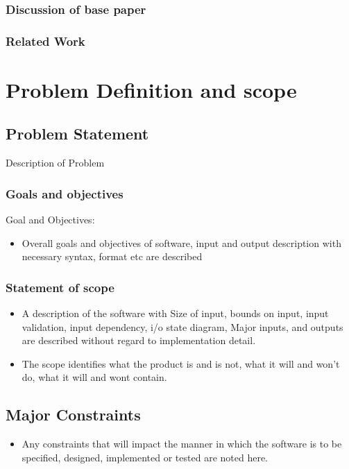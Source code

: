 \documentclass[12pt,a4paper]{article}
\begin{document}
\subsubsection{Discussion of base paper}
\subsubsection{Related Work}

\section{Problem Definition and scope}
\setcounter{section}{4}

\subsection{Problem Statement}

Description of Problem


\subsubsection{Goals and objectives}  

Goal and Objectives: 
\begin{itemize}
  	\item Overall goals and objectives of software, input and output description with necessary syntax, format etc are described
\end{itemize}

 \subsubsection{Statement of scope} 
	\begin{itemize}  
	\item	A description of the software with Size of input, bounds on input, input validation, input dependency, i/o state diagram, Major inputs, and outputs are described without regard to implementation detail.
	\item The scope identifies what the product is and is not, what it will and won’t do, what it will and wont contain.
	\end{itemize}


\subsection{Major Constraints}
\begin{itemize}
\item Any constraints that will impact the manner in which the software is to be specified, designed, implemented or tested are noted here.
\end{itemize}
\end{document}
